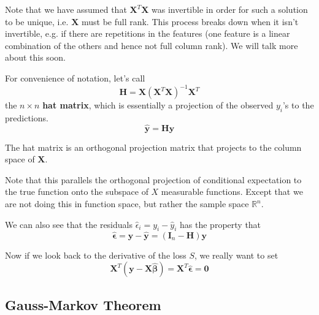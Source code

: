 \documentclass{article}
\begin{document}
    Note that we have assumed that $\mathbf{X}^T \mathbf{X}$ was invertible in order for such a solution to be unique, i.e. $\mathbf{X}$ must be full rank. This process breaks down when it isn't invertible, e.g. if there are repetitions in the features (one feature is a linear combination of the others and hence not full column rank). We will talk more about this soon. 

    \begin{definition}
      For convenience of notation, let's call 
      \begin{equation}
        \mathbf{H} = \mathbf{X} (\mathbf{X}^T \mathbf{X})^{-1} \mathbf{X}^T 
      \end{equation}
      the $n \times n$ \textbf{hat matrix}, which is essentially a projection of the observed $y_i$'s to the predictions. 
      \begin{equation}
        \hat{\mathbf{y}} = \mathbf{H} \mathbf{y}
      \end{equation}
    \end{definition}

    \begin{lemma}[Properties]
      The hat matrix is an orthogonal projection matrix that projects to the column space of $\mathbf{X}$. 
    \end{lemma}

    Note that this parallels the orthogonal projection of conditional expectation to the true function onto the subspace of $X$ measurable functions. Except that we are not doing this in function space, but rather the sample space $\mathbb{R}^n$. 

    We can also see that the residuals $\hat{\epsilon}_i = y_i - \hat{y}_i$ has the property that 
    \begin{equation}
      \hat{\boldsymbol{\epsilon}} = \mathbf{y} - \hat{\mathbf{y}} = (\mathbf{I}_n - \mathbf{H}) \mathbf{y} 
    \end{equation}

    Now if we look back to the derivative of the loss $S$, we really want to set 
    \begin{equation}
      \mathbf{X}^T (\mathbf{y} - \mathbf{X} \hat{\boldsymbol{\beta}}) = \mathbf{X}^T \hat{\boldsymbol{\epsilon}} = \mathbf{0}
    \end{equation}

  \subsection{Gauss-Markov Theorem}
\end{document}

